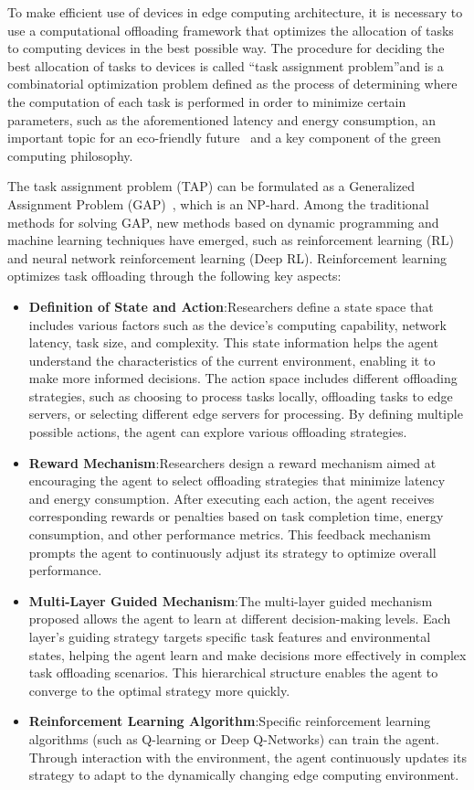 \documentclass[journal]{IEEEtran}
\begin{document}
To make efficient use of devices in edge computing architecture, it is necessary to use a computational offloading framework that optimizes the allocation of tasks to computing devices in the best possible way. The procedure for deciding the best allocation of tasks to devices is called “task assignment problem”and is a combinatorial optimization problem defined as the process of determining where the computation of each task is performed in order to minimize certain parameters, such as the aforementioned latency and energy consumption, an important topic for an eco-friendly future~\cite{pyyz006} and a key component of the green computing philosophy.

The task assignment problem (TAP) can be formulated as a Generalized Assignment Problem (GAP)~\cite{pyyz007}, which is an NP-hard. Among the traditional methods for solving GAP, new methods based on dynamic programming and machine learning techniques have emerged, such as reinforcement learning (RL) and neural network reinforcement learning (Deep RL). Reinforcement learning optimizes task offloading through the following key aspects:

\begin{itemize}
\item \textbf{Definition of State and Action}:Researchers define a state space that includes various factors such as the device's computing capability, network latency, task size, and complexity. This state information helps the agent understand the characteristics of the current environment, enabling it to make more informed decisions. The action space includes different offloading strategies, such as choosing to process tasks locally, offloading tasks to edge servers, or selecting different edge servers for processing. By defining multiple possible actions, the agent can explore various offloading strategies.
\item \textbf{Reward Mechanism}:Researchers design a reward mechanism aimed at encouraging the agent to select offloading strategies that minimize latency and energy consumption. After executing each action, the agent receives corresponding rewards or penalties based on task completion time, energy consumption, and other performance metrics. This feedback mechanism prompts the agent to continuously adjust its strategy to optimize overall performance.
\item \textbf{Multi-Layer Guided Mechanism}:The multi-layer guided mechanism proposed allows the agent to learn at different decision-making levels. Each layer's guiding strategy targets specific task features and environmental states, helping the agent learn and make decisions more effectively in complex task offloading scenarios. This hierarchical structure enables the agent to converge to the optimal strategy more quickly.
\item \textbf{Reinforcement Learning Algorithm}:Specific reinforcement learning algorithms (such as Q-learning or Deep Q-Networks) can train the agent. Through interaction with the environment, the agent continuously updates its strategy to adapt to the dynamically changing edge computing environment.
\end{itemize}
\end{document}
